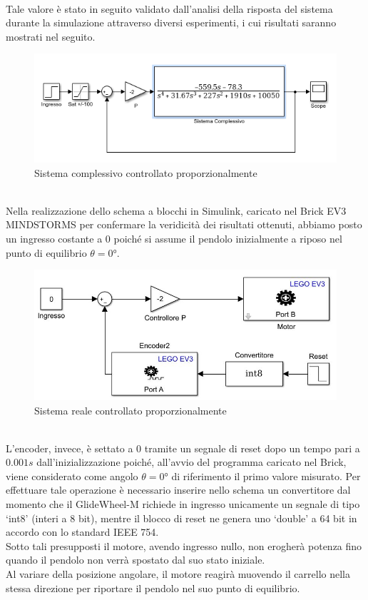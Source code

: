 \\Tale valore è stato in seguito validato dall'analisi della risposta del sistema  durante la simulazione attraverso diversi esperimenti, i cui risultati saranno mostrati nel seguito.
\begin{figure}[ht]
	\centering
	\includegraphics[width=\textwidth]{SisComplessivoPNRetroazionato.PNG}
	\caption{Sistema complessivo controllato proporzionalmente}
	\label{SisComplessivoPNRetroazionato}
\end{figure}
\\Nella realizzazione dello schema a blocchi in Simulink, caricato nel Brick EV3 MINDSTORMS per confermare la veridicità dei risultati ottenuti, abbiamo posto un ingresso costante a 0 poiché si assume il pendolo inizialmente a riposo nel punto di equilibrio $\theta=\ang{0}$.
\begin{figure}[ht]
	\centering
	\includegraphics[width=\textwidth]{pendoloReale.jpg}
	\caption{Sistema reale controllato proporzionalmente}
	\label{pendoloReale}
\end{figure}
\\L'encoder, invece, è settato a $0$ tramite un segnale di reset dopo un tempo pari a $0.001s$ dall'inizializzazione poiché, all'avvio del programma caricato nel Brick, viene considerato come angolo $\theta=\ang{0}$ di riferimento il primo valore misurato.
Per effettuare tale operazione è necessario inserire nello schema un convertitore dal momento che il GlideWheel-M richiede in ingresso unicamente un segnale di tipo `int8' (interi a 8 bit), mentre il blocco di reset ne genera uno `double' a 64 bit in accordo con lo standard IEEE 754.\\
Sotto tali presupposti il motore, avendo ingresso nullo, non erogherà potenza fino quando il pendolo non verrà spostato dal suo stato iniziale.\\
Al variare della posizione angolare, il motore reagirà muovendo il carrello nella stessa direzione per riportare il pendolo nel suo punto di equilibrio.

